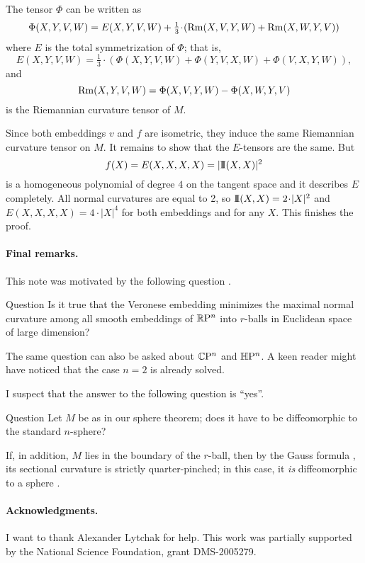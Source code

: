 \documentclass[a4paper,10pt]{article}
\begin{document}
The tensor $\Phi$ can be written as
\[\Phi(X,Y,V,W)=E(X,Y,V,W)+\tfrac 1 3\cdot(\Rm(X,V,Y,W)+\Rm(X,W,Y,V))\]
where $E$ is the total symmetrization of $\Phi$; that is,
$$E(X,Y,V,W)=\tfrac 1 3\cdot
(\Phi(X,Y,V,W)+\Phi(Y,V,X,W)+\Phi(V,X,Y,W)),$$
and
$$\operatorname{\rm Rm}(X,Y,V,W)=\Phi(X,V,Y,W)-\Phi(X,W,Y,V)$$
is the Riemannian curvature tensor of $M$.

Since both embeddings $v$ and $f$ are isometric, they induce the same Riemannian curvature tensor on $M$.
It remains to show that the $E$-tensors are the same.
But 
\[f(X)=E(X,X,X,X)\z=|\II(X,X)|^2\]
is a homogeneous polynomial of degree $4$ on the tangent space 
and it describes $E$ completely.
All normal curvatures are equal to 2,
so $\II(X,X)\z=2\cdot|X|^2$ and $E(X,X,X,X)=4\cdot|X|^4$ 
for both embeddings and for any $X$.
This finishes the proof.
\qeds

\paragraph{Final remarks.}
This note was motivated by the following question \cite{petrunin2023}.

\begin{thm}{Question}
Is it true that the Veronese embedding minimizes the maximal normal curvature among all smooth embeddings of $\mathbb{R}\mathrm{P}^n$ into $r$-balls in Euclidean space of large dimension?
\end{thm}

The same question can also be asked about $\mathbb{C}\mathrm{P}^n$ and $\mathbb{H}\mathrm{P}^n$. 
A keen reader might have noticed that the case $n=2$ is already solved.

I suspect that the answer to the following question is ``yes''.

\begin{thm}{Question}
Let $M$ be as in our sphere theorem;
does it have to be diffeomorphic to the standard $n$-sphere?
\end{thm}

If, in addition, $M$ lies in the boundary of the $r$-ball, then by the Gauss formula \cite[Lemma 5]{petrunin2024}, its sectional curvature is strictly quarter-pinched;
in this case, it \textit{is} diffeomorphic to a sphere \cite{brendle-schoen}.

\paragraph{Acknowledgments.}
I want to thank Alexander Lytchak for help.
This work was partially supported by the National Science Foundation, grant DMS-2005279.

{\sloppy
\def\emph{\textit}
\printbibliography[heading=bibintoc]
\fussy
}
\end{document}
